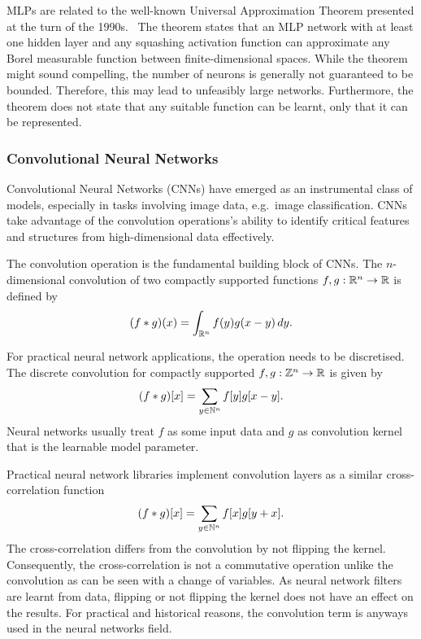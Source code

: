MLPs are related to the well-known Universal Approximation Theorem presented at the turn of the 1990s.~\cite{cybenko,horniketal,hornik}
The theorem states that an MLP network with at least one hidden layer and any squashing activation function can approximate any Borel measurable function between finite-dimensional spaces.
While the theorem might sound compelling, the number of neurons is generally not guaranteed to be bounded.
Therefore, this may lead to unfeasibly large networks.
Furthermore, the theorem does not state that any suitable function can be learnt, only that it can be represented.

\subsubsection{Convolutional Neural Networks}
Convolutional Neural Networks (CNNs) have emerged as an instrumental class of models, especially in tasks involving image data, e.g.\ image classification.
CNNs take advantage of the convolution operations's ability to identify critical features and structures from high-dimensional data effectively.

The convolution operation is the fundamental building block of CNNs.
The $n$-dimensional convolution of two compactly supported functions $f, g : \mathbb{R}^n \rightarrow \mathbb{R}$ is defined by
\begin{equation*}
    (f * g)(x) = \int_{\mathbb{R}^n} f(y) g(x-y) \, dy.
\end{equation*}

For practical neural network applications, the operation needs to be discretised.
The discrete convolution for compactly supported $f, g : \mathbb{Z}^n \rightarrow \mathbb{R}$ is given by 
\begin{equation*}
    (f * g)[x] = \sum_{y \in \mathbb{N}^{n}} f[y] g[x-y].
\end{equation*}
Neural networks usually treat $f$ as some input data and $g$ as convolution kernel that is the learnable model parameter.


Practical neural network libraries implement convolution layers as a similar cross-correlation function~\cite{goodfellow}
\begin{equation*}
    (f * g)[x] = \sum_{y \in \mathbb{N}^{n}} f[x] g[y+x].
\end{equation*}
The cross-correlation differs from the convolution by not flipping the kernel.
Consequently, the cross-correlation is not a commutative operation unlike the convolution as can be seen with a change of variables.
As neural network filters are learnt from data, flipping or not flipping the kernel does not have an effect on the results.
For practical and historical reasons, the convolution term is anyways used in the neural networks field.

